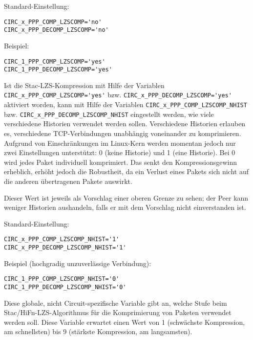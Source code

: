 \begin{description}
Standard-Einstellung:

\verb+CIRC_x_PPP_COMP_LZSCOMP='no'+\\
\verb+CIRC_x_PPP_DECOMP_LZSCOMP='no'+

Beispiel:

\verb+CIRC_1_PPP_COMP_LZSCOMP='yes'+\\
\verb+CIRC_1_PPP_DECOMP_LZSCOMP='yes'+


Ist die Stac-LZS-Kompression mit Hilfe der Variablen
\verb+CIRC_x_PPP_COMP_LZSCOMP='yes'+ bzw. \verb+CIRC_x_PPP_DECOMP_LZSCOMP='yes'+
aktiviert worden, kann mit Hilfe der Variablen
\verb+CIRC_x_PPP_COMP_LZSCOMP_NHIST+ bzw. \verb+CIRC_x_PPP_DECOMP_LZSCOMP_NHIST+
eingestellt werden, wie viele verschiedene Historien verwendet werden sollen.
Verschiedene Historien erlauben es, verschiedene TCP-Verbindungen unabhängig
voneinander zu komprimieren. Aufgrund von Einschränkungen im Linux-Kern werden
momentan jedoch nur zwei Einstellungen unterstützt: 0 (keine Historie) und 1
(eine Historie). Bei 0 wird jedes Paket individuell komprimiert. Das senkt den
Kompressionsgewinn erheblich, erhöht jedoch die Robustheit, da ein Verlust eines
Pakets sich nicht auf die anderen übertragenen Pakete auswirkt.

Dieser Wert ist jeweils als Vorschlag einer oberen Grenze zu sehen; der Peer
kann weniger Historien aushandeln, falls er mit dem Vorschlag nicht
einverstanden ist.

Standard-Einstellung:

\verb+CIRC_x_PPP_COMP_LZSCOMP_NHIST='1'+\\
\verb+CIRC_x_PPP_DECOMP_LZSCOMP_NHIST='1'+

Beispiel (hochgradig unzuverlässige Verbindung):

\verb+CIRC_1_PPP_COMP_LZSCOMP_NHIST='0'+\\
\verb+CIRC_1_PPP_DECOMP_LZSCOMP_NHIST='0'+


Diese globale, nicht Circuit-spezifische Variable gibt an, welche
Stufe beim Stac/HiFn-LZS-Algorithmus für die Komprimierung von Paketen verwendet
werden soll. Diese Variable erwartet einen Wert von 1 (schwächste Kompression,
am schnellsten) bis 9 (stärkste Kompression, am langsamsten).


\end{description}
